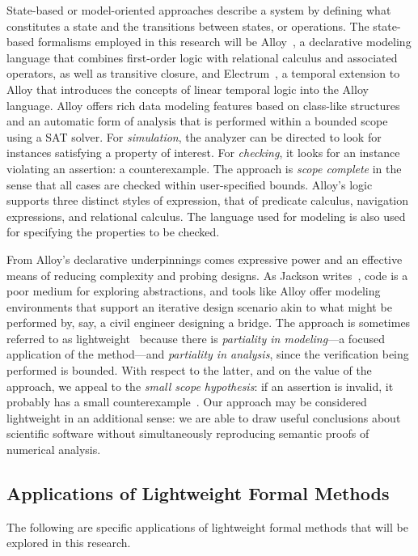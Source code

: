 \documentclass[../../proposal.tex]{subfiles}
\begin{document}
State-based or model-oriented approaches describe a system by defining what constitutes a state and the transitions between states, or operations.  The state-based formalisms employed in this research will be Alloy~\cite{jackson2012}, a declarative modeling language that combines first-order logic with relational calculus and associated operators, as well as transitive closure, and Electrum~\cite{}, a temporal extension to Alloy that introduces the concepts of linear temporal logic into the Alloy language.  Alloy offers rich data modeling features based on class-like structures and an automatic form of analysis that is performed within a bounded scope using a SAT solver.  For \emph{simulation}, the analyzer can be directed to look for instances satisfying a property of interest.  For \emph{checking}, it looks for an instance violating an assertion: a counterexample.  The approach is \emph{scope complete} in the sense that all cases are checked within user-specified bounds.  Alloy's logic supports three distinct styles of expression, that of predicate calculus, navigation expressions, and relational calculus.  The language used for modeling is also used for specifying the properties to be checked.

From Alloy's declarative underpinnings comes expressive power and an effective means of reducing complexity and probing designs.  As Jackson writes~\cite{jackson2012}, code is a poor medium for exploring abstractions, and tools like Alloy offer modeling environments that support an iterative design scenario akin to what might be performed by, say, a civil engineer designing a bridge. The approach is sometimes referred to as lightweight~\cite{} because there is \emph{partiality in modeling}---a focused application of the method---and \emph{partiality in analysis}, since the verification being performed is bounded.  With respect to the latter, and on the value of the approach, we appeal to the \emph{small scope hypothesis}: if an assertion is invalid, it probably has a small counterexample~\cite{}.  Our approach may be considered lightweight in an additional sense: we are able to draw useful conclusions about scientific software without simultaneously reproducing semantic proofs of numerical analysis.

\subsection{Applications of Lightweight Formal Methods}

The following are specific applications of lightweight formal methods that will be explored in this research.
\end{document}
